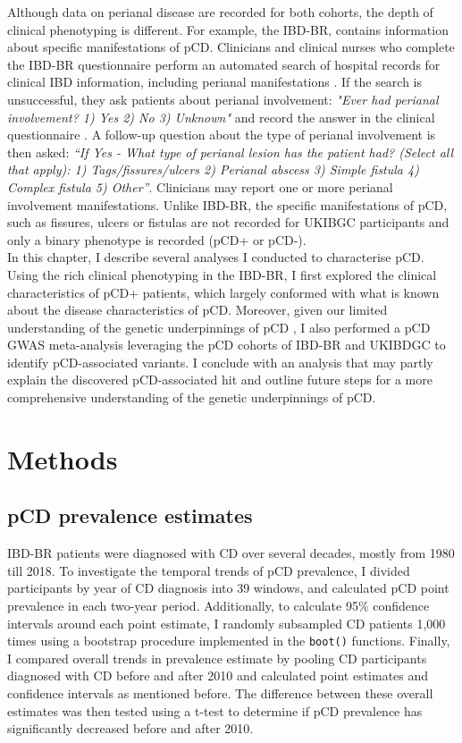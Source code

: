 Although data on perianal disease are recorded for both cohorts, the depth of clinical phenotyping is different. For example, the IBD-BR, contains information about specific manifestations of pCD. Clinicians and clinical nurses who complete the IBD-BR questionnaire perform an automated search of hospital records for clinical IBD information, including perianal manifestations \cite{ibdbr-protocol-v8}.  If the search is unsuccessful, they ask patients about perianal involvement: \textit{"Ever had perianal involvement? 1) Yes 2) No 3) Unknown"}  and record the answer in the clinical questionnaire \cite{ibdbr-questionnaire-v7}. A follow-up question about the type of perianal involvement is then asked: \textit{“If Yes - What type of perianal lesion has the patient had? (Select all that apply): 1) Tags/fissures/ulcers 2) Perianal abscess 3) Simple fistula 4) Complex fistula 5) Other”}. Clinicians may report one or more perianal involvement manifestations.  Unlike IBD-BR, the specific manifestations of pCD, such as fissures, ulcers or fistulas are not recorded for UKIBGC participants and only a binary phenotype is recorded (pCD+ or pCD-). \\

In this chapter, I describe several analyses I conducted to characterise pCD. Using the rich clinical phenotyping in the IBD-BR, I first explored the clinical characteristics of pCD+ patients, which largely conformed with what is known about the disease characteristics of pCD. Moreover, given our limited understanding of the genetic underpinnings of pCD \cite{Eglinton2012-ls,Latiano2009-bu,Tozer2009-mp,Akhlaghpour2023-jw,Kaur2016-bs}, I also performed a pCD GWAS meta-analysis leveraging the pCD cohorts of IBD-BR and UKIBDGC to identify pCD-associated variants. I conclude with an analysis that may partly explain the discovered pCD-associated hit and outline future steps for a more comprehensive understanding of the genetic underpinnings of pCD.
\section{Methods}
\subsection{pCD prevalence estimates}
IBD-BR patients were diagnosed with CD over several decades, mostly from 1980 till 2018. To investigate the temporal trends of pCD prevalence, I divided participants by year of CD diagnosis into 39 windows, and calculated pCD point prevalence in each two-year period. Additionally, to calculate 95\% confidence intervals around each point estimate, I randomly subsampled CD patients 1,000 times using a bootstrap procedure implemented in the \Verb+boot()+ functions. Finally, I compared overall trends in prevalence estimate by pooling CD participants diagnosed with CD before and after 2010 and calculated point estimates and confidence intervals as mentioned before. The difference between these overall estimates was then tested using a t-test to determine if pCD prevalence has significantly decreased before and after 2010.
